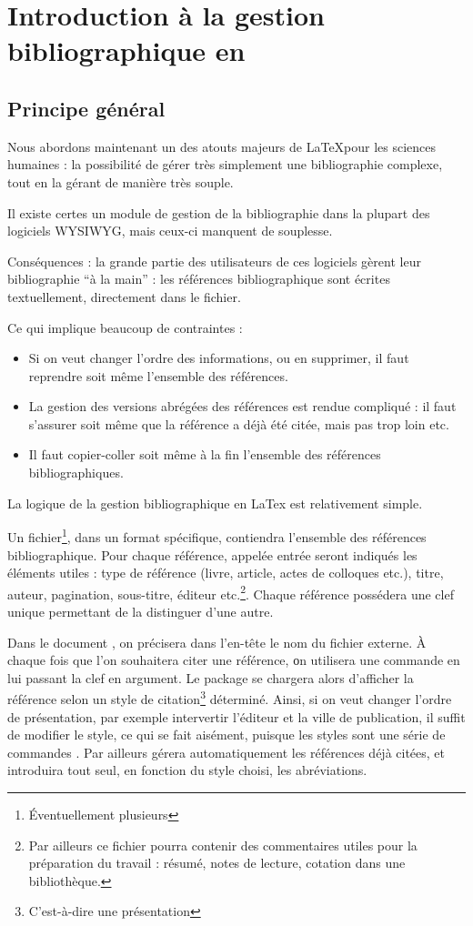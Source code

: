 \chapter[Introduction]{Introduction à la gestion bibliographique en \LaTex}
\section{Principe général}

Nous abordons maintenant un des atouts majeurs de \LaTeX pour les sciences humaines : la possibilité de gérer très simplement une bibliographie complexe, tout en la gérant de manière très souple.

Il existe certes un module de gestion de la bibliographie dans la plupart des logiciels WYSIWYG, mais ceux-ci manquent de souplesse.

Conséquences : la grande partie des utilisateurs de ces logiciels gèrent leur bibliographie \enquote{à la main} : les références bibliographique sont écrites textuellement, directement dans le fichier. 

Ce qui implique beaucoup de contraintes  :
\begin{itemize}
\item Si on veut changer l'ordre des informations, ou en supprimer, il faut reprendre soit même l'ensemble des références.
\item La gestion des versions abrégées des références est rendue compliqué :  il faut s'assurer soit même que la référence a déjà été citée, mais pas trop loin etc. 
\item Il faut copier-coller soit même à la fin l'ensemble des références bibliographiques. 
\end{itemize}

La logique de la gestion bibliographique en LaTex est relativement simple.

Un fichier\footnote{Éventuellement plusieurs}, dans un format spécifique, contiendra l'ensemble des références bibliographique. Pour chaque référence, appelée entrée seront indiqués les éléments utiles :  type de référence (livre, article, actes de colloques etc.), titre, auteur, pagination, sous-titre, éditeur etc.\footnote{Par ailleurs ce fichier pourra contenir des commentaires utiles pour la préparation du travail : résumé, notes de lecture, cotation dans une bibliothèque.
}. Chaque référence possédera une clef unique permettant de la distinguer d'une autre.

Dans le document \LaTex, on précisera dans l'en-tête le nom du fichier externe. À chaque fois que l'on souhaitera citer une référence, οn utilisera une commande en lui passant la clef en argument. Le package  se chargera alors d'afficher la référence selon un style de citation\footnote{C’est-à-dire une présentation} déterminé. Ainsi, si on veut changer l'ordre de présentation, par exemple intervertir l'éditeur et la ville de publication, il suffit de modifier le style, ce qui se fait aisément, puisque les styles sont une série de commandes \latex. Par ailleurs  gérera automatiquement les références déjà citées, et introduira tout seul, en fonction du style choisi, les abréviations. 

